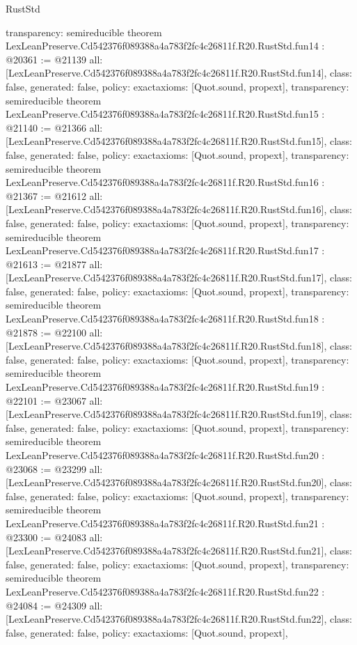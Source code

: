 \begin{lexlean}{RustStd}
\begin{coremodule}
{  transparency: semireducible
}
theorem LexLeanPreserve.Cd542376f089388a4a783f2fc4c26811f.R20.RustStd.fun14 : @20361 := @21139 {
  all: [LexLeanPreserve.Cd542376f089388a4a783f2fc4c26811f.R20.RustStd.fun14],
  class: false,
  generated: false,
  policy: exact{axioms: [Quot.sound, propext]},
  transparency: semireducible
}
theorem LexLeanPreserve.Cd542376f089388a4a783f2fc4c26811f.R20.RustStd.fun15 : @21140 := @21366 {
  all: [LexLeanPreserve.Cd542376f089388a4a783f2fc4c26811f.R20.RustStd.fun15],
  class: false,
  generated: false,
  policy: exact{axioms: [Quot.sound, propext]},
  transparency: semireducible
}
theorem LexLeanPreserve.Cd542376f089388a4a783f2fc4c26811f.R20.RustStd.fun16 : @21367 := @21612 {
  all: [LexLeanPreserve.Cd542376f089388a4a783f2fc4c26811f.R20.RustStd.fun16],
  class: false,
  generated: false,
  policy: exact{axioms: [Quot.sound, propext]},
  transparency: semireducible
}
theorem LexLeanPreserve.Cd542376f089388a4a783f2fc4c26811f.R20.RustStd.fun17 : @21613 := @21877 {
  all: [LexLeanPreserve.Cd542376f089388a4a783f2fc4c26811f.R20.RustStd.fun17],
  class: false,
  generated: false,
  policy: exact{axioms: [Quot.sound, propext]},
  transparency: semireducible
}
theorem LexLeanPreserve.Cd542376f089388a4a783f2fc4c26811f.R20.RustStd.fun18 : @21878 := @22100 {
  all: [LexLeanPreserve.Cd542376f089388a4a783f2fc4c26811f.R20.RustStd.fun18],
  class: false,
  generated: false,
  policy: exact{axioms: [Quot.sound, propext]},
  transparency: semireducible
}
theorem LexLeanPreserve.Cd542376f089388a4a783f2fc4c26811f.R20.RustStd.fun19 : @22101 := @23067 {
  all: [LexLeanPreserve.Cd542376f089388a4a783f2fc4c26811f.R20.RustStd.fun19],
  class: false,
  generated: false,
  policy: exact{axioms: [Quot.sound, propext]},
  transparency: semireducible
}
theorem LexLeanPreserve.Cd542376f089388a4a783f2fc4c26811f.R20.RustStd.fun20 : @23068 := @23299 {
  all: [LexLeanPreserve.Cd542376f089388a4a783f2fc4c26811f.R20.RustStd.fun20],
  class: false,
  generated: false,
  policy: exact{axioms: [Quot.sound, propext]},
  transparency: semireducible
}
theorem LexLeanPreserve.Cd542376f089388a4a783f2fc4c26811f.R20.RustStd.fun21 : @23300 := @24083 {
  all: [LexLeanPreserve.Cd542376f089388a4a783f2fc4c26811f.R20.RustStd.fun21],
  class: false,
  generated: false,
  policy: exact{axioms: [Quot.sound, propext]},
  transparency: semireducible
}
theorem LexLeanPreserve.Cd542376f089388a4a783f2fc4c26811f.R20.RustStd.fun22 : @24084 := @24309 {
  all: [LexLeanPreserve.Cd542376f089388a4a783f2fc4c26811f.R20.RustStd.fun22],
  class: false,
  generated: false,
  policy: exact{axioms: [Quot.sound, propext]},
}
\end{coremodule}
\end{lexlean}

